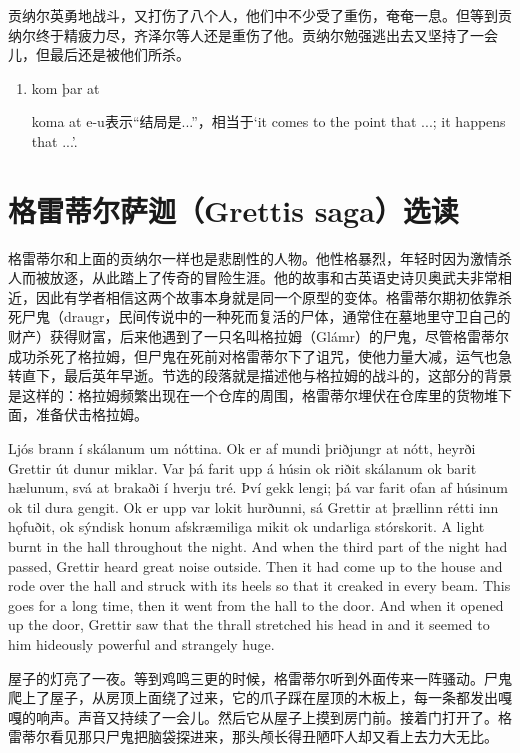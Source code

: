 \begin{translation*}{}
    贡纳尔英勇地战斗，又打伤了八个人，他们中不少受了重伤，奄奄一息。但等到贡纳尔终于精疲力尽，齐泽尔等人还是重伤了他。贡纳尔勉强逃出去又坚持了一会儿，但最后还是被他们所杀。
\end{translation*}
\begin{grammar*}{}
    \begin{enumerate}[leftmargin=*]
        \item kom þar at

              koma at e-u表示“结局是...”，相当于`it comes to the point that ...; it happens that ...'.
    \end{enumerate}
\end{grammar*}
\section{格雷蒂尔萨迦（Grettis saga）选读}
格雷蒂尔和上面的贡纳尔一样也是悲剧性的人物。他性格暴烈，年轻时因为激情杀人而被放逐，从此踏上了传奇的冒险生涯。他的故事和古英语史诗贝奥武夫非常相近，因此有学者相信这两个故事本身就是同一个原型的变体。格雷蒂尔期初依靠杀死尸鬼（draugr，民间传说中的一种死而复活的尸体，通常住在墓地里守卫自己的财产）获得财富，后来他遇到了一只名叫格拉姆（Glámr）的尸鬼，尽管格雷蒂尔成功杀死了格拉姆，但尸鬼在死前对格雷蒂尔下了诅咒，使他力量大减，运气也急转直下，最后英年早逝。节选的段落就是描述他与格拉姆的战斗的，这部分的背景是这样的：格拉姆频繁出现在一个仓库的周围，格雷蒂尔埋伏在仓库里的货物堆下面，准备伏击格拉姆。
\begin{paracol}{2}
    Ljós brann í skálanum um nóttina. Ok er af mundi þriðjungr at nótt, heyrði Grettir út dunur miklar. Var þá farit upp á húsin ok riðit skálanum ok barit hælunum, svá at brakaði í hverju tré. Því gekk lengi; þá var farit ofan af húsinum ok til dura gengit. Ok er upp var lokit hurðunni, sá Grettir at þrællinn rétti inn hǫfuðit, ok sýndisk honum afskræmiliga mikit ok undarliga stórskorit.
    \switchcolumn
    A light burnt in the hall throughout the night. And when the third part of the night had passed, Grettir heard great noise outside. Then it had come up to the house and rode over the hall and struck with its heels so that it creaked in every beam. This goes for a long time, then it went from the hall to the door. And when it opened up the door, Grettir saw that the thrall stretched his head in and it seemed to him hideously powerful and strangely huge.
\end{paracol}
\begin{translation*}{}
    屋子的灯亮了一夜。等到鸡鸣三更的时候，格雷蒂尔听到外面传来一阵骚动。尸鬼爬上了屋子，从房顶上面绕了过来，它的爪子踩在屋顶的木板上，每一条都发出嘎嘎的响声。声音又持续了一会儿。然后它从屋子上摸到房门前。接着门打开了。格雷蒂尔看见那只尸鬼把脑袋探进来，那头颅长得丑陋吓人却又看上去力大无比。
\end{translation*}
